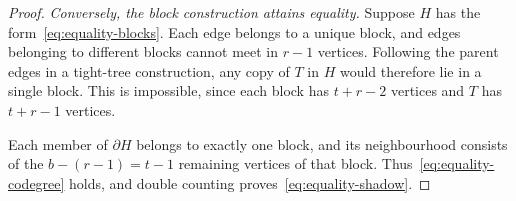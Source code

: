 \documentclass[10pt,a4paper]{amsart}
\newcommand{\sh}{\partial}
\begin{document}
\begin{proof}
		\medskip\noindent
		\emph{Conversely, the block construction attains equality.}
		Suppose $H$ has the form~\eqref{eq:equality-blocks}. Each
		edge belongs to a unique block, and edges belonging to
		different blocks cannot meet in $r-1$ vertices. Following
		the parent edges in a tight-tree construction, any copy of
		$T$ in $H$ would therefore lie in a single block. This is
		impossible, since each block has $t+r-2$ vertices and $T$
		has $t+r-1$ vertices.
		
		Each member of $\sh H$ belongs to exactly one block, and
		its neighbourhood consists of the $b-(r-1)=t-1$ remaining
		vertices of that block. Thus~\eqref{eq:equality-codegree}
		holds, and double counting proves~\eqref{eq:equality-shadow}.
	\end{proof}
\end{document}
